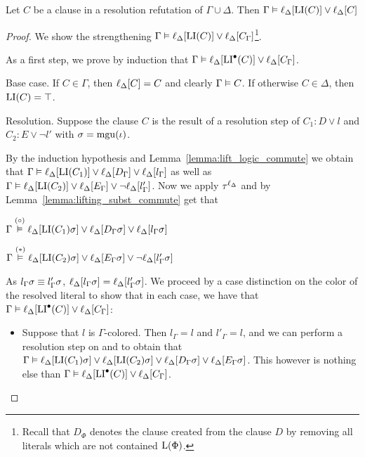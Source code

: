 \begin{lemma}
	\label{lemma:gamma_entails_delta_lifted_invariant}
	Let $C$ be a clause in a resolution refutation of $\Gamma \cup \Delta$.
	Then
	$\Gamma \vDash \ell_{\Delta}[ \operatorname{LI}(C) ] \lor \ell_{\Delta}[C] $
\end{lemma}
\begin{proof}
	We show the strengthening
	$\Gamma \vDash \ell_{\Delta}[ \operatorname{LI}(C) ] \lor \ell_{\Delta}[C_\Gamma]$\footnote{Recall that $D_\Phi$ denotes the clause created from the clause $D$ by removing all literals which are not contained $\operatorname{L}(\Phi)$.}.

	As a first step, 
	we prove by induction that
	$\Gamma \vDash \ell_{\Delta}[ \operatorname{LI}^\bullet(C) ] \lor \ell_{\Delta}[C_\Gamma]$.


	\begin{description}
		\item{} Base case.
			If $C\in \Gamma$, then $\ell_{\Delta}[C] = C$ and clearly $\Gamma \vDash C$.
			If otherwise $C \in \Delta$, then $\operatorname{LI}(C) = \top$.

		\item{} Resolution.
			Suppose the clause $C$ is the result of a resolution step \inference{} of $C_1: D \lor l$ and $C_2: E \lor \lnot l'$ with $\sigma = \operatorname{mgu}(\iota)$.

			By the induction hypothesis and Lemma~\ref{lemma:lift_logic_commute} we obtain that
			$\Gamma \vDash \ell_{\Delta}[\operatorname{LI}(C_1)] \lor \ell_{\Delta}[D_\Gamma] \lor \ell_{\Delta}[l_\Gamma]$
			as well as 
			$\Gamma \vDash \ell_{\Delta}[\operatorname{LI}(C_2)] \lor \ell_{\Delta}[E_\Gamma] \lor \lnot \ell_{\Delta}[l'_\Gamma]$.
			Now we apply $\tau^{\ell_\Delta}$ and by Lemma~\ref{lemma:lifting_subst_commute} get that 

			$\Gamma \stackrel{(\circ)}{\vDash} \ell_{\Delta}[\operatorname{LI}(C_1)\sigma] \lor \ell_{\Delta}[D_\Gamma\sigma] \lor \ell_{\Delta}[l_\Gamma\sigma]$

			$\Gamma \stackrel{(*)}{\vDash} \ell_{\Delta}[\operatorname{LI}(C_2)\sigma] \lor \ell_{\Delta}[E_\Gamma\sigma] \lor \lnot \ell_{\Delta}[l'_\Gamma\sigma]$

			As $l_\Gamma\sigma \equiv l'_\Gamma\sigma$,
			$\ell_{\Delta}[l_\Gamma\sigma] = \ell_{\Delta}[l'_\Gamma\sigma]$.
			We proceed by a case distinction on the color of the resolved literal to show that in each case, we have that
			$\Gamma \vDash \ell_{\Delta}[\operatorname{LI}^\bullet(C)] \lor \ell_{\Delta}[C_\Gamma]$:
			\begin{itemize}
				\item Suppose that $l$ is $\Gamma$-colored.
					Then $l_\Gamma = l$ and $l'_\Gamma = l$, and we can perform a resolution step on \markA{} and \markB{} to obtain that
					$\Gamma \vDash
					\ell_{\Delta}[\operatorname{LI}(C_1)\sigma] \lor
					\ell_{\Delta}[\operatorname{LI}(C_2)\sigma] \lor 
					\ell_{\Delta}[D_\Gamma\sigma]  \lor
					\ell_{\Delta}[E_\Gamma\sigma]$.
					This however is nothing else than $\Gamma \vDash \ell_{\Delta}[\operatorname{LI}^\bullet(C)] \lor \ell_{\Delta}[C_\Gamma]$.


\end{itemize}
\end{description}
\end{proof}
